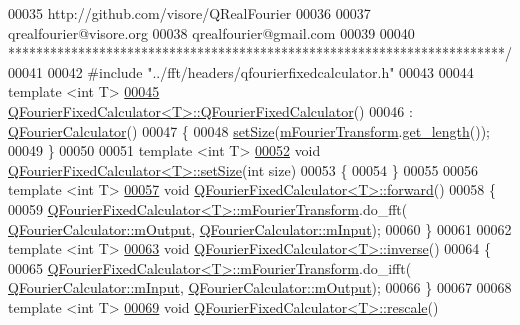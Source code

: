 \begin{DoxyCode}
00035 \textcolor{comment}{http://github.com/visore/QRealFourier}
00036 \textcolor{comment}{}
00037 \textcolor{comment}{qrealfourier@visore.org}
00038 \textcolor{comment}{qrealfourier@gmail.com}
00039 \textcolor{comment}{}
00040 \textcolor{comment}{***********************************************************************/}
00041 
00042 \textcolor{preprocessor}{#include "../fft/headers/qfourierfixedcalculator.h"}
00043 
00044 \textcolor{keyword}{template} <\textcolor{keywordtype}{int} T>
\hypertarget{a00119_source_l00045}{}\hyperlink{a00053_afec2fb9cec17894ef678ddd2b8ff06b2}{00045} \hyperlink{a00053_afec2fb9cec17894ef678ddd2b8ff06b2}{QFourierFixedCalculator<T>::QFourierFixedCalculator}()
00046     : \hyperlink{a00052}{QFourierCalculator}()
00047 \{
00048     \hyperlink{a00053_a70226b30fca6e342f2b14e61d75a5f23}{setSize}(\hyperlink{a00053_a019d8a4e7bf2b844d28891d0f7d2172d}{mFourierTransform}.\hyperlink{a00011_a73770aaf1fb19877d116adfcfcd69e26}{get\_length}());
00049 \}
00050 
00051 \textcolor{keyword}{template} <\textcolor{keywordtype}{int} T>
\hypertarget{a00119_source_l00052}{}\hyperlink{a00053_a70226b30fca6e342f2b14e61d75a5f23}{00052} \textcolor{keywordtype}{void} \hyperlink{a00053_a70226b30fca6e342f2b14e61d75a5f23}{QFourierFixedCalculator<T>::setSize}(\textcolor{keywordtype}{int} size)
00053 \{
00054 \}
00055 
00056 \textcolor{keyword}{template} <\textcolor{keywordtype}{int} T>
\hypertarget{a00119_source_l00057}{}\hyperlink{a00053_adb47db1084fbdaccf260b6e490ed116f}{00057} \textcolor{keywordtype}{void} \hyperlink{a00053_adb47db1084fbdaccf260b6e490ed116f}{QFourierFixedCalculator<T>::forward}()
00058 \{
00059     \hyperlink{a00053}{QFourierFixedCalculator<T>::mFourierTransform}.do\_fft(
      \hyperlink{a00052_a44e6b65579dba529c38d2ae35f97e18d}{QFourierCalculator::mOutput}, 
      \hyperlink{a00052_ac14a86f60463eed27b3b1beab135e689}{QFourierCalculator::mInput});
00060 \}
00061 
00062 \textcolor{keyword}{template} <\textcolor{keywordtype}{int} T>
\hypertarget{a00119_source_l00063}{}\hyperlink{a00053_abdb573e6145140de2e5b96ba155fd86d}{00063} \textcolor{keywordtype}{void} \hyperlink{a00053_abdb573e6145140de2e5b96ba155fd86d}{QFourierFixedCalculator<T>::inverse}()
00064 \{
00065     \hyperlink{a00053}{QFourierFixedCalculator<T>::mFourierTransform}.do\_ifft(
      \hyperlink{a00052_ac14a86f60463eed27b3b1beab135e689}{QFourierCalculator::mInput}, 
      \hyperlink{a00052_a44e6b65579dba529c38d2ae35f97e18d}{QFourierCalculator::mOutput});
00066 \}
00067 
00068 \textcolor{keyword}{template} <\textcolor{keywordtype}{int} T>
\hypertarget{a00119_source_l00069}{}\hyperlink{a00053_a28f08b0466a5fe5ad7b7b0fe591e9544}{00069} \textcolor{keywordtype}{void} \hyperlink{a00053_a28f08b0466a5fe5ad7b7b0fe591e9544}{QFourierFixedCalculator<T>::rescale}()

\end{DoxyCode}
